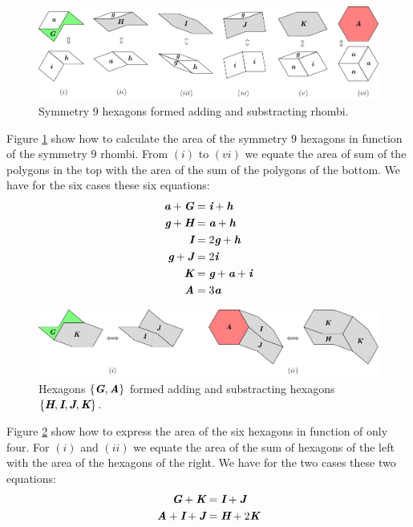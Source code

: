 \documentclass[11pt]{article}
\def\mathbi#1{\textbf{\em #1}}
\begin{document}
\begin{figure}[H]
\centering
\includegraphics[scale=1]{hexagons-from-rhombi-9}
\caption{Symmetry $9$ hexagons formed adding and substracting rhombi.}
\label{fig:hexagons-from-rhombi-9}
\end{figure}

Figure \ref{fig:hexagons-from-rhombi-9} show how to calculate the area of the symmetry $9$ hexagons in function of the symmetry $9$ rhombi. From $(i)$ to $(vi)$ we equate the area of sum of the polygons in the top with the area of the sum of the polygons of the bottom. We have for the six cases these six equations:
\begin{align}
\mathbi{a} + \mathbi{G} &= \mathbi{i} + \mathbi{h} \\
\mathbi{g} + \mathbi{H} &= \mathbi{a} + \mathbi{h} \\
\mathbi{I} &= 2\mathbi{g} + \mathbi{h} \\
\mathbi{g} + \mathbi{J} &= 2\mathbi{i} \\
\mathbi{K} &= \mathbi{g} + \mathbi{a} + \mathbi{i} \\
\mathbi{A} &= 3\mathbi{a}
\end{align}

\begin{figure}[H]
\centering
\includegraphics[scale=1]{hexagons-from-hexagons-9}
\caption{Hexagons $\{\mathbi{G},\mathbi{A}\}$ formed adding and substracting hexagons $\{\mathbi{H},\mathbi{I},\mathbi{J},\mathbi{K}\}$.}
\label{fig:hexagons-from-hexagons-9}
\end{figure}

Figure \ref{fig:hexagons-from-hexagons-9} show how to express the area of the six hexagons in function of only four. For $(i)$ and $(ii)$ we equate the area of the sum of hexagons of the left with the area of the hexagons of the right. We have for the two cases these two equations:
\begin{align}
\mathbi{G} + \mathbi{K} &= \mathbi{I} + \mathbi{J} \\
\mathbi{A} + \mathbi{I} + \mathbi{J} &= \mathbi{H} + 2\mathbi{K}
\end{align}
\end{document}

